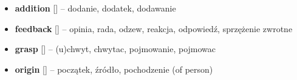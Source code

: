 \documentclass[a4paper,12pt]{book}
\begin{document}
	\begin{itemize}
\item \textbf{addition} [] – dodanie, dodatek, dodawanie
\item \textbf{feedback} [] – opinia, rada, odzew, reakcja, odpowiedź, sprzężenie zwrotne
\item \textbf{grasp} [] – (u)chwyt, chwytac, pojmowanie, pojmowac
\item \textbf{origin} [] – początek, źródło, pochodzenie (of person)
	\end{itemize}
\end{document}

